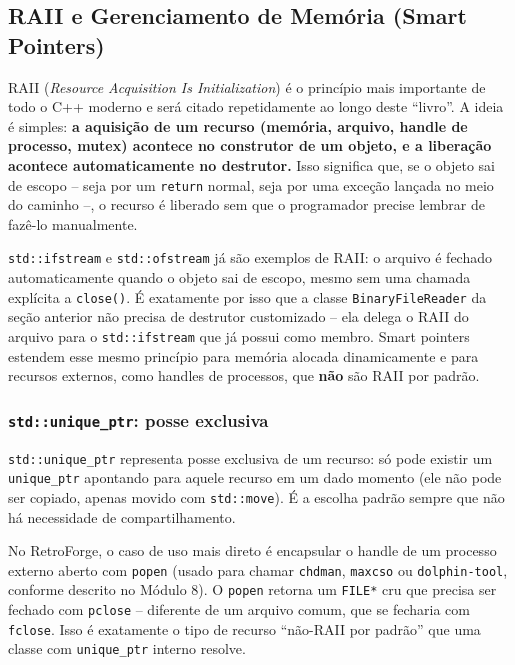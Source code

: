 \subsection{RAII e Gerenciamento de Memória (Smart Pointers)}

RAII (\textit{Resource Acquisition Is Initialization}) é o princípio mais importante de todo o C++ moderno e será citado repetidamente ao longo deste ``livro''. A ideia é simples: \textbf{a aquisição de um recurso (memória, arquivo, handle de processo, mutex) acontece no construtor de um objeto, e a liberação acontece automaticamente no destrutor.} Isso significa que, se o objeto sai de escopo -- seja por um \texttt{return} normal, seja por uma exceção lançada no meio do caminho --, o recurso é liberado sem que o programador precise lembrar de fazê-lo manualmente.

\begin{CaixaInfo}
\texttt{std::ifstream} e \texttt{std::ofstream} já são exemplos de RAII: o arquivo é fechado automaticamente quando o objeto sai de escopo, mesmo sem uma chamada explícita a \texttt{close()}. É exatamente por isso que a classe \texttt{BinaryFileReader} da seção anterior não precisa de destrutor customizado -- ela delega o RAII do arquivo para o \texttt{std::ifstream} que já possui como membro. Smart pointers estendem esse mesmo princípio para memória alocada dinamicamente e para recursos externos, como handles de processos, que \textbf{não} são RAII por padrão.
\end{CaixaInfo}

\subsubsection{\texttt{std::unique\_ptr}: posse exclusiva}

\texttt{std::unique\_ptr} representa posse exclusiva de um recurso: só pode existir um \texttt{unique\_ptr} apontando para aquele recurso em um dado momento (ele não pode ser copiado, apenas movido com \texttt{std::move}). É a escolha padrão sempre que não há necessidade de compartilhamento.

No RetroForge, o caso de uso mais direto é encapsular o handle de um processo externo aberto com \texttt{popen} (usado para chamar \texttt{chdman}, \texttt{maxcso} ou \texttt{dolphin-tool}, conforme descrito no Módulo 8). O \texttt{popen} retorna um \texttt{FILE*} cru que precisa ser fechado com \texttt{pclose} -- diferente de um arquivo comum, que se fecharia com \texttt{fclose}. Isso é exatamente o tipo de recurso ``não-RAII por padrão'' que uma classe com \texttt{unique\_ptr} interno resolve.

